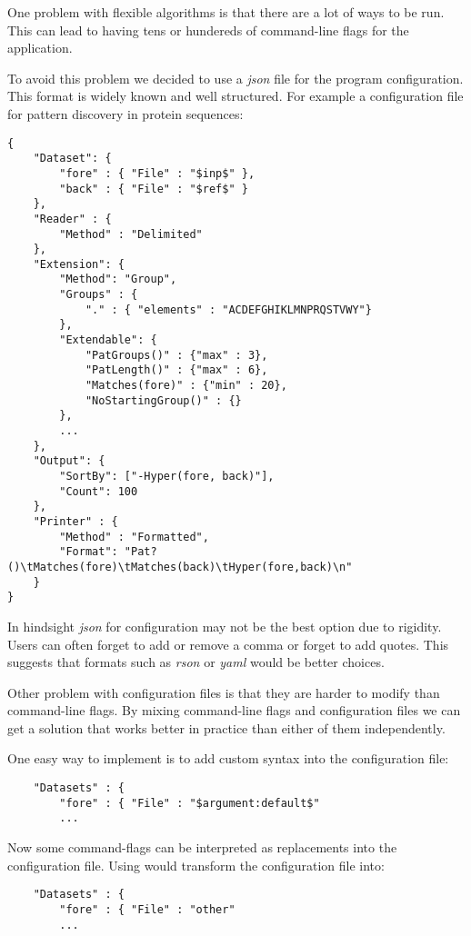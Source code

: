 One problem with flexible algorithms is that there are a lot of ways to be run. This can lead to having tens or hundereds of command-line flags for the application.

To avoid this problem we decided to use a \emph{json} file for the program configuration. This format is widely known and well structured. For example a configuration file for pattern discovery in protein sequences:

\begin{lstlisting}
{
    "Dataset": {
        "fore" : { "File" : "$inp$" },
        "back" : { "File" : "$ref$" }
    },
    "Reader" : {
        "Method" : "Delimited"
    },
    "Extension": {
        "Method": "Group",
        "Groups" : {
            "." : { "elements" : "ACDEFGHIKLMNPRQSTVWY"}
        },
        "Extendable": {
            "PatGroups()" : {"max" : 3},
            "PatLength()" : {"max" : 6},
            "Matches(fore)" : {"min" : 20},
            "NoStartingGroup()" : {}
        },
        ...
    },
    "Output": {
        "SortBy": ["-Hyper(fore, back)"],
        "Count": 100
    },
    "Printer" : {
        "Method" : "Formatted",
        "Format": "Pat?()\tMatches(fore)\tMatches(back)\tHyper(fore,back)\n"
    }
}
\end{lstlisting}

In hindsight \emph{json} for configuration may not be the best option due to rigidity. Users can often forget to add or remove a comma or forget to add quotes. This suggests that formats such as \emph{rson} or \emph{yaml} would be better choices.

Other problem with configuration files is that they are harder to modify than command-line flags. By mixing command-line flags and configuration files we can get a solution that works better in practice than either of them independently.

One easy way to implement is to add custom syntax into the configuration file:

\begin{lstlisting}
    "Datasets" : {
        "fore" : { "File" : "$argument:default$"
        ...
\end{lstlisting}

Now some command-flags can be interpreted as replacements into the configuration file. Using  would transform the configuration file into:

\begin{lstlisting}
    "Datasets" : {
        "fore" : { "File" : "other"
        ...
\end{lstlisting}

